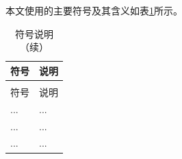 本文使用的主要符号及其含义如表\ref{tab:符号说明}所示。

\begin{longtable}{>{\centering\arraybackslash}p{}>{\centering\arraybackslash}p{}}
  \caption{符号说明}
  \label{tab:符号说明} \\
  \toprule
  符号 & 说明 \\
  \midrule
  \endfirsthead
  \caption{符号说明（续）} \\
  \toprule
  符号 & 说明 \\
  \midrule
  \endhead
  \bottomrule
  \endfoot
  ... & ... \\
  ... & ... \\
  ... & ...
\end{longtable}

